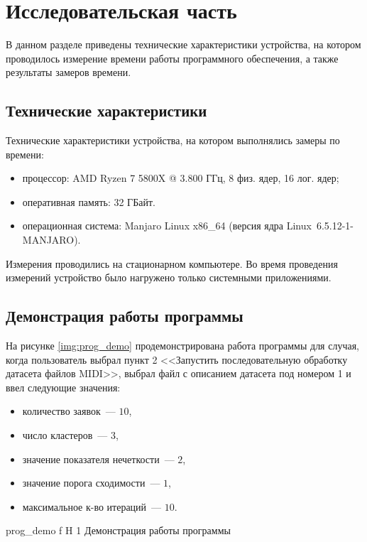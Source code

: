 \chapter{Исследовательская часть}

В данном разделе приведены технические характеристики устройства, на котором проводилось измерение времени работы программного обеспечения, а также результаты замеров времени.

\section{Технические характеристики}

Технические характеристики устройства, на котором выполнялись замеры по времени:

\begin{itemize}
	\item процессор: AMD Ryzen 7 5800X @ 3.800 ГГц, 8 физ. ядер, 16 лог. ядер;
	\item оперативная память: 32 ГБайт.
	\item операционная система: Manjaro Linux x86\_64 (версия ядра Linux~6.5.12-1-MANJARO).
\end{itemize}

Измерения проводились на стационарном компьютере.
Во время проведения измерений устройство было нагружено только системными приложениями.

\section{Демонстрация работы программы}

На рисунке \ref{img:prog_demo} продемонстрирована работа программы для случая, когда пользователь выбрал пункт 2 <<Запустить последовательную обработку датасета файлов MIDI>>, выбрал файл с описанием датасета под номером 1 и ввел следующие значения:
\begin{itemize}
	\item количество заявок~--- $10$,
	\item число кластеров~--- $3$,
	\item значение показателя нечеткости~--- $2$,
	\item значение порога сходимости~--- $1$,
	\item максимальное к-во итераций~--- $10$.
\end{itemize}

	{prog_demo}
	{f}
	{H}
	{1\textwidth}
	{Демонстрация работы программы}


